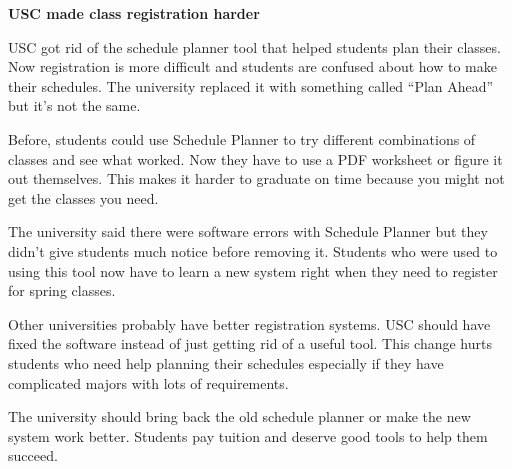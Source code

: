 \documentclass[12pt]{article}
\begin{document}
\newpage
\begin{originalversion}
\textbf{USC made class registration harder}

USC got rid of the schedule planner tool that helped students plan their classes. Now registration is more difficult and students are confused about how to make their schedules. The university replaced it with something called ``Plan Ahead'' but it's not the same.

Before, students could use Schedule Planner to try different combinations of classes and see what worked. Now they have to use a PDF worksheet or figure it out themselves. This makes it harder to graduate on time because you might not get the classes you need.

The university said there were software errors with Schedule Planner but they didn't give students much notice before removing it. Students who were used to using this tool now have to learn a new system right when they need to register for spring classes.

Other universities probably have better registration systems. USC should have fixed the software instead of just getting rid of a useful tool. This change hurts students who need help planning their schedules especially if they have complicated majors with lots of requirements.

The university should bring back the old schedule planner or make the new system work better. Students pay tuition and deserve good tools to help them succeed.
\end{originalversion}
\end{document}
